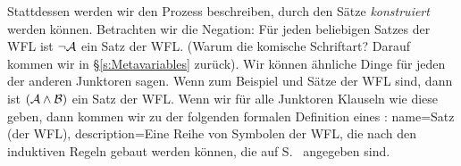 Stattdessen werden wir den Prozess beschreiben, durch den Sätze \emph{konstruiert} werden können. Betrachten wir die Negation: Für jeden beliebigen Satzes  der WFL ist $\neg \mathcal{A}$ ein Satz der WFL. (Warum die komische Schriftart? Darauf kommen wir in \S\ref{s:Metavariables} zurück). Wir können ähnliche Dinge für jeden der anderen Junktoren sagen. Wenn zum Beispiel  und  Sätze der WFL sind, dann ist $(\mathcal{A}\wedge \mathcal{B})$ ein Satz der WFL. Wenn wir für alle Junktoren Klauseln wie diese geben, dann kommen wir zu der folgenden formalen Definition eines :
{
name=Satz (der WFL),
description={Eine Reihe von Symbolen der WFL, die nach den induktiven Regeln gebaut werden können, die auf  S.~\pageref{TFLsentences} angegeben sind.}
}

